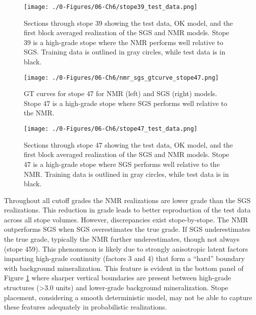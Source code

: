 \begin{figure}[htb!]
    \centering
    \texttt{[image: ./0-Figures/06-Ch6/stope39\_test\_data.png]}
    \caption{Sections through stope 39 showing the test data, \gls{OK} model, and the first block averaged realization of the \gls{SGS} and \gls{NMR} models. Stope 39 is a high-grade stope where the \gls{NMR} performs well relative to \gls{SGS}. Training data is outlined in gray circles, while test data is in black.}
    \label{fig:stope39_test_data}
\end{figure}

\begin{figure}[htb!]
    \centering
    \texttt{[image: ./0-Figures/06-Ch6/nmr\_sgs\_gtcurve\_stope47.png]}
    \caption{\Gls{GT} curves for stope 47 for \gls{NMR} (left) and \gls{SGS} (right) models. Stope 47 is a high-grade stope where \gls{SGS} performs well relative to the \gls{NMR}.}
    \label{fig:nmr_sgs_gtcurve_stope47}
\end{figure}

\begin{figure}[htb!]
    \centering
    \texttt{[image: ./0-Figures/06-Ch6/stope47\_test\_data.png]}
    \caption{Sections through stope 47 showing the test data, \gls{OK} model, and the first block averaged realization of the \gls{SGS} and \gls{NMR} models. Stope 47 is a high-grade stope where \gls{SGS} performs well relative to the \gls{NMR}. Training data is outlined in gray circles, while test data is in black. }
    \label{fig:stope47_test_data}
\end{figure}

Throughout all cutoff grades the \gls{NMR} realizations are lower grade than the \gls{SGS} realizations. This reduction in grade leads to better reproduction of the test data across all stope volumes. However, discrepancies exist stope-by-stope. The \gls{NMR} outperforms \gls{SGS} when \gls{SGS} overestimates the true grade. If \gls{SGS} underestimates the true grade, typically the \gls{NMR} further underestimates, though not always (stope 459). This phenomenon is likely due to strongly anisotropic latent factors imparting high-grade continuity (factors 3 and 4) that form a ``hard'' boundary with background mineralization. This feature is evident in the bottom panel of Figure \ref{fig:stope39_test_data} where sharper vertical boundaries are present between high-grade structures (>3.0 units) and lower-grade background mineralization. Stope placement, considering a smooth deterministic model, may not be able to capture these features adequately in probabilistic realizations.

